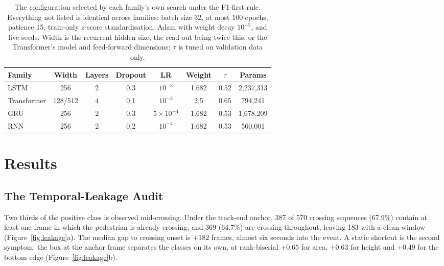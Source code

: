 \documentclass[mti,article,submit,moreauthors]{Definitions/mdpi}
\begin{document}
\begin{table}[htbp]
\caption{The configuration selected by each family's own search under the F1-first rule. Everything not listed is identical across families: batch size 32, at most 100 epochs, patience 15, train-only $z$-score standardisation, Adam with weight decay $10^{-5}$, and five seeds. Width is the recurrent hidden size, the read-out being twice this, or the Transformer's model and feed-forward dimensions; $\tau$ is tuned on validation data only.\label{tab:hparams}}
\begin{tabularx}{\textwidth}{lCCCCCCC}
\toprule
\textbf{Family} & \textbf{Width} & \textbf{Layers} & \textbf{Dropout} & \textbf{LR} & \textbf{Weight} & \textbf{$\tau$} & \textbf{Params}\\
\midrule
LSTM & 256 & 2 & 0.3 & $10^{-3}$ & 1.682 & 0.52 & 2,237,313\\
Transformer & 128/512 & 4 & 0.1 & $10^{-3}$ & 2.5 & 0.65 & 794,241\\
GRU & 256 & 2 & 0.3 & $5\times10^{-4}$ & 1.682 & 0.53 & 1,678,209\\
RNN & 256 & 2 & 0.2 & $10^{-4}$ & 1.682 & 0.53 & 560,001\\
\bottomrule
\end{tabularx}

\end{table}

\section{Results}
\label{sec:results}

\subsection{The Temporal-Leakage Audit}
\label{sec:leakage-results}

Two thirds of the positive class is observed mid-crossing. Under the track-end anchor, 387 of 570 crossing sequences (67.9\%) contain at least one frame in which the pedestrian is already crossing, and 369 (64.7\%) are crossing throughout, leaving 183 with a clean window (Figure~\ref{fig:leakage}a). The median gap to crossing onset is $+182$ frames, almost six seconds into the event. A static shortcut is the second symptom: the box at the anchor frame separates the classes on its own, at rank-biserial $+0.65$ for area, $+0.63$ for height and $+0.49$ for the bottom edge (Figure~\ref{fig:leakage}b).
\end{document}

